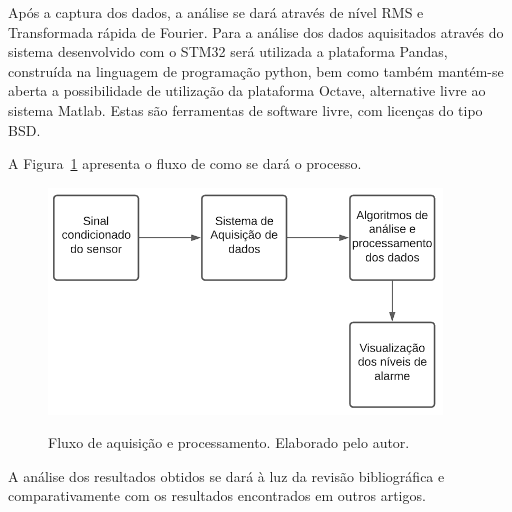 \documentclass[
	12pt,				
	oneside,			
	a4paper,			
	english,			
	brazil,			
	]{abntex2ppgsi}
\begin{document}
Após a captura dos dados, a análise se dará através de nível RMS e Transformada rápida de Fourier. Para a análise dos dados aquisitados através do sistema desenvolvido com o STM32 será utilizada a plataforma Pandas, construída na linguagem de programação python, bem como também mantém-se aberta a possibilidade de utilização da plataforma Octave, alternative livre ao sistema Matlab. Estas são ferramentas de software livre, com licenças do tipo BSD. 

A Figura~\ref{fluxograma_aquisicao} apresenta o fluxo de como se dará o processo.

\begin{figure}[H]
\centering
\caption {Fluxo de aquisição e processamento. Elaborado pelo autor.}
\includegraphics[width=\textwidth,height=60mm,keepaspectratio]{fluxograma_funcionamento_sistema}
\label{fluxograma_aquisicao}
\end{figure} 



A análise dos resultados obtidos se dará à luz da revisão bibliográfica e comparativamente com os resultados encontrados em outros artigos. 

\section{}
\label{secao:CircuitosCondicionadores}
\end{document}
